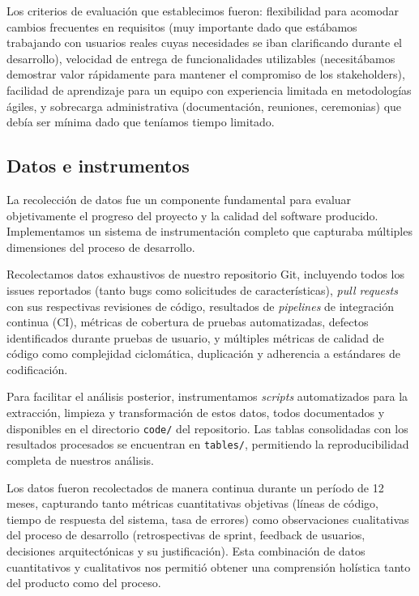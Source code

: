 Los criterios de evaluación que establecimos fueron: flexibilidad para acomodar cambios frecuentes en requisitos (muy importante dado que estábamos trabajando con usuarios reales cuyas necesidades se iban clarificando durante el desarrollo), velocidad de entrega de funcionalidades utilizables (necesitábamos demostrar valor rápidamente para mantener el compromiso de los stakeholders), facilidad de aprendizaje para un equipo con experiencia limitada en metodologías ágiles, y sobrecarga administrativa (documentación, reuniones, ceremonias) que debía ser mínima dado que teníamos tiempo limitado.

\subsection{Datos e instrumentos}

La recolección de datos fue un componente fundamental para evaluar objetivamente el progreso del proyecto y la calidad del software producido. Implementamos un sistema de instrumentación completo que capturaba múltiples dimensiones del proceso de desarrollo.

Recolectamos datos exhaustivos de nuestro repositorio Git, incluyendo todos los issues reportados (tanto bugs como solicitudes de características), \textit{pull requests} con sus respectivas revisiones de código, resultados de \textit{pipelines} de integración continua (CI), métricas de cobertura de pruebas automatizadas, defectos identificados durante pruebas de usuario, y múltiples métricas de calidad de código como complejidad ciclomática, duplicación y adherencia a estándares de codificación.

Para facilitar el análisis posterior, instrumentamos \textit{scripts} automatizados para la extracción, limpieza y transformación de estos datos, todos documentados y disponibles en el directorio \texttt{code/} del repositorio. Las tablas consolidadas con los resultados procesados se encuentran en \texttt{tables/}, permitiendo la reproducibilidad completa de nuestros análisis.

Los datos fueron recolectados de manera continua durante un período de 12 meses, capturando tanto métricas cuantitativas objetivas (líneas de código, tiempo de respuesta del sistema, tasa de errores) como observaciones cualitativas del proceso de desarrollo (retrospectivas de sprint, feedback de usuarios, decisiones arquitectónicas y su justificación). Esta combinación de datos cuantitativos y cualitativos nos permitió obtener una comprensión holística tanto del producto como del proceso.

